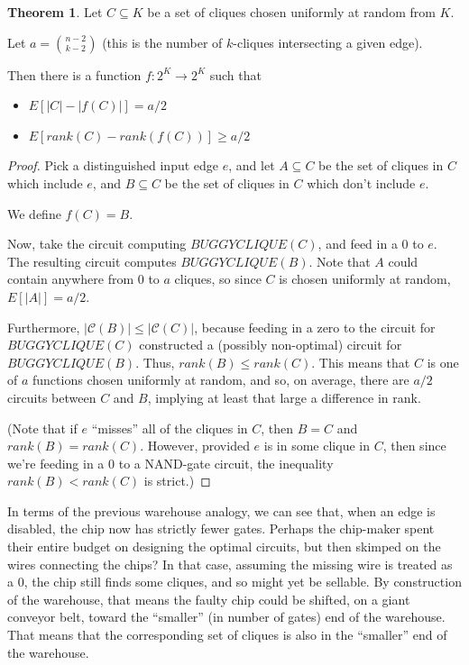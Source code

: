 \documentclass[12pt]{article}
\theoremstyle{definition}
\newtheorem{thm}{Theorem}[section]
\newcommand{\bigC}[0]{\mathcal{C}}
\begin{document}
\begin{thm}
\label{vaguelyUpward}
Let $C \subseteq K$ be a set of cliques chosen uniformly at random
from $K$.

Let $a = {n-2 \choose k-2}$ (this is the number of $k$-cliques
intersecting a given edge).

Then there is a function $f: 2^K \rightarrow 2^K$ such that
\begin{itemize}

\item $E[|C| - |f(C)|] = a/2$

\item $E[rank(C) - rank(f(C))] \ge a/2$

\end{itemize}

\end{thm}
\begin{proof}

Pick a distinguished input edge $e$, and let $A \subseteq C$ be
the set of cliques in $C$ which include $e$, and $B \subseteq C$ be
the set of cliques in $C$ which don't include $e$.

We define $f(C) = B$.

Now, take the circuit computing $BUGGYCLIQUE(C)$, and
feed in a 0 to $e$. The resulting circuit computes
$BUGGYCLIQUE(B)$. Note that $A$ could contain anywhere
from 0 to $a$
cliques, so since $C$ is chosen uniformly at random,
$E[|A|] = a/2$.

Furthermore, $|\bigC(B)| \le |\bigC(C)|$, because feeding in
a zero to the circuit for $BUGGYCLIQUE(C)$ constructed a
(possibly non-optimal) circuit for $BUGGYCLIQUE(B)$.
Thus, $rank(B) \le rank(C)$.
This means that
$C$ is one of $a$ functions chosen uniformly at random,
and so, on average, there are $a/2$ circuits between $C$
and $B$, implying at least that large a difference in rank.

(Note that if $e$ ``misses'' all of the cliques in $C$, then $B = C$
and $rank(B) = rank(C)$. However, provided $e$ is in some clique in $C$,
then since we're feeding in a 0 to a NAND-gate circuit,
the inequality $rank(B) < rank(C)$ is strict.)

\end{proof}

In terms of the previous warehouse analogy, we can see that,
when an edge is disabled, the chip now has strictly fewer gates.
Perhaps the chip-maker spent their entire budget on designing the
optimal circuits, but then skimped on the wires connecting the chips?
In that case, assuming the missing wire is treated as a 0, the chip still
finds some cliques, and so might yet be sellable.
By construction of the warehouse, that means the faulty chip could be shifted,
on a giant conveyor belt,
toward the ``smaller'' (in number of gates) end of the warehouse.
That means that the corresponding set of cliques is also
in the ``smaller'' end of the warehouse.
\end{document}
